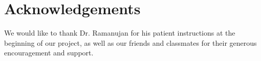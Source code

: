 
\section{Acknowledgements} 
\label{sec:ack} 

We would like to thank Dr. Ramanujan for his patient instructions at the beginning of our project, as well as our friends and classmates for their generous encouragement and support. 
